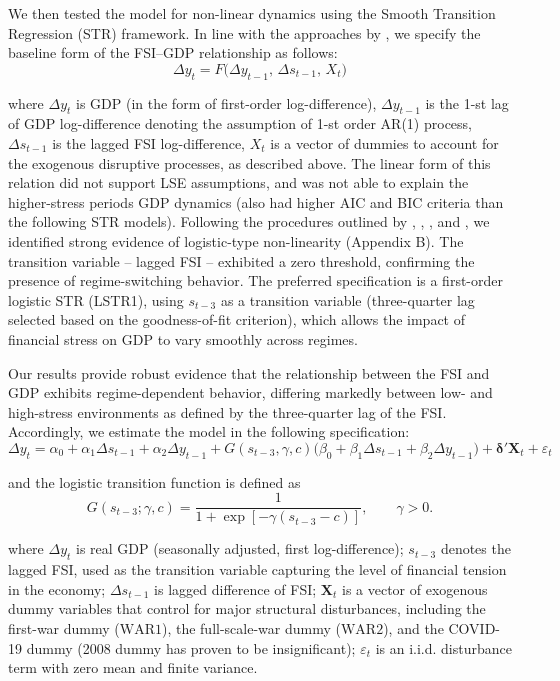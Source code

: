 \documentclass[12pt,preprint,aps,author-year]{revtex4-1}
\begin{document}
We then tested the model for non-linear dynamics using the Smooth Transition Regression (STR) framework. In line with the approaches by \cite{ahir2023}, we specify the baseline form of the FSI–GDP relationship as follows:
\begin{equation}\label{eq:baseline}
\Delta y_t = F\big(\Delta y_{t-1},\, \Delta s_{t-1},\, X_t\big)
\end{equation}

where $\Delta y_t$ is GDP (in the form of first-order log-difference), $\Delta y_{t-1}$ is the 1-st lag of GDP log-difference denoting the assumption of 1-st order AR(1) process, $\Delta s_{t-1}$ is the lagged FSI log-difference, $X_t$ is a vector of dummies to account for the exogenous disruptive processes, as described above. The linear form of this relation did not support LSE assumptions, and was not able to explain the higher-stress periods GDP dynamics (also had higher AIC and BIC criteria than the following STR models). Following the procedures outlined by \cite{terasvirta1994}, \cite{luukkonen1988}, \cite{terasvirta1998}, and \cite{escribano1999}, we identified strong evidence of logistic-type non-linearity (Appendix B). The transition variable – lagged FSI – exhibited a zero threshold, confirming the presence of regime-switching behavior. The preferred specification is a first-order logistic STR (LSTR1), using $s_{t-3}$ as a transition variable (three-quarter lag selected based on the goodness-of-fit criterion), which allows the impact of financial stress on GDP to vary smoothly across regimes.

Our results provide robust evidence that the relationship between the FSI and GDP exhibits regime-dependent behavior, differing markedly between low- and high-stress environments as defined by the three-quarter lag of the FSI. Accordingly, we estimate the model in the following specification:
\begin{equation}\label{eq:lstr}
\Delta y_t = \alpha_0 + \alpha_1 \Delta s_{t-1} + \alpha_2 \Delta y_{t-1}
+ G(s_{t-3},\gamma,c)\big(\beta_0 + \beta_1 \Delta s_{t-1} + \beta_2 \Delta y_{t-1}\big)
+ \boldsymbol{\delta}'\mathbf{X}_t + \varepsilon_t
\end{equation}

and the logistic transition function is defined as
\begin{equation}\label{eq:logistic}
G(s_{t-3};\gamma,c)=\frac{1}{1+\exp[-\gamma(s_{t-3}-c)]}, \qquad \gamma>0.
\end{equation}

where $\Delta y_t$ is real GDP (seasonally adjusted, first log-difference); $s_{t-3}$ denotes the lagged FSI, used as the transition variable capturing the level of financial tension in the economy; $\Delta s_{t-1}$ is lagged difference of FSI; $\mathbf{X}_t$ is a vector of exogenous dummy variables that control for major structural disturbances, including the first-war dummy ($\text{WAR1}$), the full-scale-war dummy ($\text{WAR2}$), and the COVID-19 dummy (2008 dummy has proven to be insignificant); $\varepsilon_t$ is an i.i.d. disturbance term with zero mean and finite variance.
\end{document}
